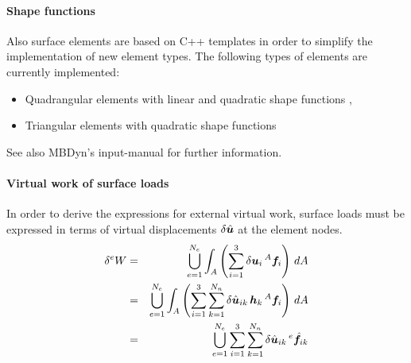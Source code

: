 \paragraph{Shape functions}
Also surface elements are based on C++ templates in order to simplify the implementation of new element types.
The following types of elements are currently implemented:
\begin{itemize}
\item Quadrangular elements with linear and quadratic shape functions \cite{BATHE2016}, \cite{DHONDT2004}
\item Triangular elements with quadratic shape functions \cite{CODEASTERR30301}
\end{itemize}
See also MBDyn's input-manual for further information.

\paragraph{Virtual work of surface loads}
In order to derive the expressions for external virtual work, surface loads must be expressed in terms of
virtual displacements $\delta\hat{\bm{u}}$ at the element nodes.
\begin{eqnarray}
\delta{^e}W & = & \bigcup_{e=1}^{N_e}\int_{A} \left(\sum_{i=1}^3 \delta\bm{u}_i\,{^A}\bm{f}_i \right)\,dA \\
          & = & \bigcup_{e=1}^{N_e}\int_{A} \left(\sum_{i=1}^3 \sum_{k=1}^{N_n} \delta\hat{\bm{u}}_{ik} \, \bm{h}_{k} \, {^A}\bm{f}_i \right) \, dA \\
          & = & \bigcup_{e=1}^{N_e} \sum_{i=1}^3 \sum_{k=1}^{N_n} \delta\hat{\bm{u}}_{ik} \, {^e}\hat{\bm{f}}_{ik}
\end{eqnarray}
